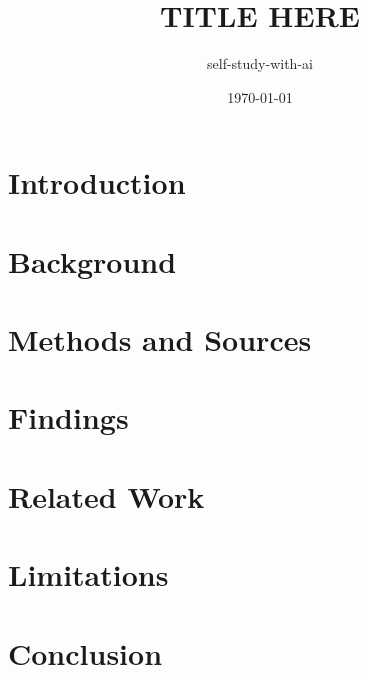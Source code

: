 \documentclass[11pt]{article}
\title{TITLE HERE}
\author{self-study-with-ai}
\date{\today}
\begin{document}
\maketitle

\begin{abstract}
\end{abstract}

\section{Introduction}

\section{Background}

\section{Methods and Sources}

\section{Findings}

\section{Related Work}

\section{Limitations}

\section{Conclusion}



\end{document}
